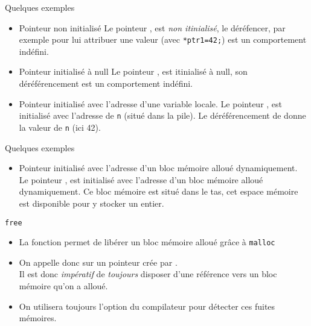 \documentclass[10pt]{beamer}
\begin{document}
\begin{frame}[fragile]{\Ctitle}{\stitle}
	\begin{exampleblock}{Quelques exemples}
		\begin{itemize}
		\item<1-> Pointeur non initialisé
		Le pointeur , est \textit{non itinialisé}, le déréfencer, par exemple pour lui attribuer une valeur (avec \texttt{*ptr1=42;}) est un comportement indéfini.
		\item<2-> Pointeur initialisé à {\sc null}
		Le pointeur , est itinialisé à {\sc null}, son déréférencement est un comportement indéfini. 
		\item<3-> Pointeur initialisé avec l'adresse d'une variable locale.
		Le pointeur , est initialisé avec l'adresse de {\tt n} (situé dans la pile). Le déréférencement de  donne la valeur de {\tt n} (ici 42).
		\end{itemize}
	\end{exampleblock}
\end{frame}

\begin{frame}[fragile]{\Ctitle}{\stitle}
	\begin{exampleblock}{Quelques exemples}
		\begin{itemize}
			\item<1-> Pointeur initialisé avec l'adresse d'un bloc mémoire alloué dynamiquement.
			Le pointeur , est initialisé avec l'adresse d'un bloc mémoire alloué dynamiquement. Ce bloc mémoire est situé dans le \textcolor{BrickRed}{tas}, cet espace mémoire est disponible pour y stocker un entier.
		\end{itemize}
	\end{exampleblock}
\end{frame}

\begin{frame}[fragile]{\Ctitle}{\stitle}
	\begin{alertblock}{{\tt free}}
		\begin{itemize}
			\item<1-> La fonction  permet de libérer un bloc mémoire alloué grâce à {\tt malloc}
			\item<2-> On appelle donc  sur un pointeur  crée  par . \\
			\textcolor{BrickRed}{\small \danger \;}{Il est donc \textit{impératif} de \textit{toujours} disposer d'une référence vers un bloc mémoire qu'on a alloué.}
			\item<4-> On utilisera toujours l'option  du compilateur pour détecter ces fuites mémoires.
		\end{itemize}
	\end{alertblock}
\end{frame}
\end{document}
